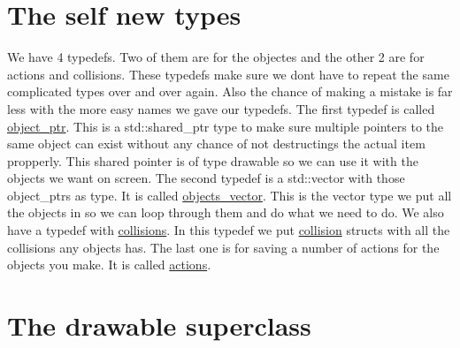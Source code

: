 \hypertarget{index_typedefs}{}\section{The self new types}\label{index_typedefs}
We have 4 typedefs. Two of them are for the objectes and the other 2 are for actions and collisions. These typedefs make sure we dont have to repeat the same complicated types over and over again. Also the chance of making a mistake is far less with the more easy names we gave our typedefs. The first typedef is called \hyperlink{typedefs_8hpp_aab5add95f06d2ba25dbfed8eb07274fa}{object\+\_\+ptr}. This is a std\+::shared\+\_\+ptr type to make sure multiple pointers to the same object can exist without any chance of not destructings the actual item propperly. This shared pointer is of type drawable so we can use it with the objects we want on screen. The second typedef is a std\+::vector with those object\+\_\+ptrs as type. It is called \hyperlink{typedefs_8hpp_a6c0fdb1dfd0c34dbbdbb5dcd3c608b07}{objects\+\_\+vector}. This is the vector type we put all the objects in so we can loop through them and do what we need to do. We also have a typedef with \hyperlink{typedefs_8hpp_a7e1a7f34f6d09dabb4cdafd6e4118603}{collisions}. In this typedef we put \hyperlink{structcollision}{collision} structs with all the collisions any objects has. The last one is for saving a number of actions for the objects you make. It is called \hyperlink{typedefs_8hpp_a38f93e4749e0d65d51360c429766d212}{actions}.\hypertarget{index_drawable}{}\section{The drawable superclass}\label{index_drawable}
